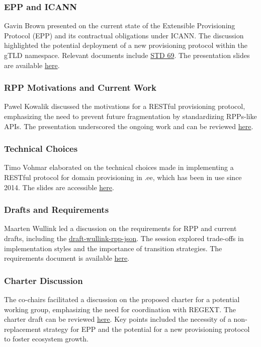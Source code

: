 \documentclass{article}
\begin{document}
\subsubsection{EPP and ICANN}
Gavin Brown presented on the current state of the Extensible Provisioning Protocol (EPP) and its contractual obligations under ICANN. The discussion highlighted the potential deployment of a new provisioning protocol within the gTLD namespace. Relevant documents include \href{https://datatracker.ietf.org/doc/html/std-69}{STD 69}. The presentation slides are available \href{https://datatracker.ietf.org/meeting/121/materials/slides-121-rpp-background-on-epp-icann-00}{here}.

\subsubsection{RPP Motivations and Current Work}
Pawel Kowalik discussed the motivations for a RESTful provisioning protocol, emphasizing the need to prevent future fragmentation by standardizing RPPs-like APIs. The presentation underscored the ongoing work and can be reviewed \href{https://datatracker.ietf.org/meeting/121/materials/slides-121-rpp-ietf-121-rpp-bof-motivation-current-work-in-the-area-01}{here}.

\subsubsection{Technical Choices}
Timo Vohmar elaborated on the technical choices made in implementing a RESTful protocol for domain provisioning in .ee, which has been in use since 2014. The slides are accessible \href{https://datatracker.ietf.org/meeting/121/materials/slides-121-rpp-restful-epp-ee-00}{here}.

\subsubsection{Drafts and Requirements}
Maarten Wullink led a discussion on the requirements for RPP and current drafts, including the \href{https://datatracker.ietf.org/doc/draft-wullink-rpp-json/}{draft-wullink-rpp-json}. The session explored trade-offs in implementation styles and the importance of transition strategies. The requirements document is available \href{https://github.com/SIDN/ietf-wg-rpp-charter/blob/main/requirements.md}{here}.

\subsubsection{Charter Discussion}
The co-chairs facilitated a discussion on the proposed charter for a potential working group, emphasizing the need for coordination with REGEXT. The charter draft can be reviewed \href{https://github.com/SIDN/ietf-wg-rpp-charter/blob/main/rpp-charter.md}{here}. Key points included the necessity of a non-replacement strategy for EPP and the potential for a new provisioning protocol to foster ecosystem growth.
\end{document}

